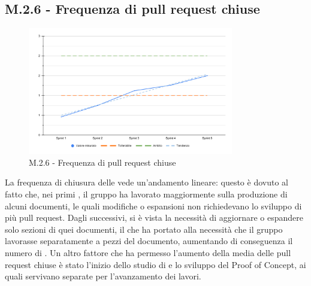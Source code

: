 \subsection{M.2.6 - Frequenza di pull request chiuse}
\begin{figure}[H]
    \centering
    \includegraphics[width=0.8\textwidth]{assets/frequenza_pull_request.pdf}
    \caption{M.2.6 - Frequenza di pull request chiuse}
\end{figure}

\par La frequenza di chiusura delle  vede un'andamento lineare: questo è dovuto al fatto che, nei primi , il gruppo ha lavorato maggiormente sulla produzione di alcuni documenti, le quali modifiche o espansioni non richiedevano lo sviluppo di più pull request. Dagli  successivi, si è vista la necessità di aggiornare o espandere solo sezioni di quei documenti, il che ha portato alla necessità che il gruppo lavorasse separatamente a pezzi del documento, aumentando di conseguenza il numero di . Un altro fattore che ha permesso l'aumento della media delle pull request chiuse è stato l'inizio dello studio di  e lo sviluppo del Proof of Concept, ai quali servivano  separate per l'avanzamento dei lavori.